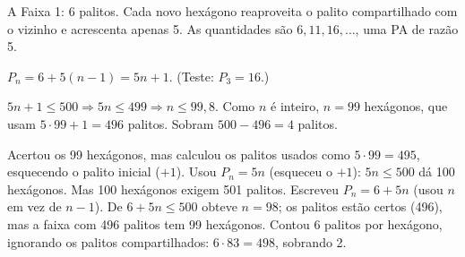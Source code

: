 \begin{resolucao}{A}
 Faixa 1: 6 palitos. Cada
novo hexágono reaproveita o palito compartilhado com o vizinho e acrescenta
apenas 5. As quantidades são $6, 11, 16, \dots$, uma PA de razão 5.

 $P_n = 6 + 5(n - 1) = 5n + 1$. (Teste: $P_3 = 16$.)

 $5n + 1 \le 500 \Rightarrow 5n \le 499
\Rightarrow n \le 99{,}8$. Como $n$ é inteiro, $n = 99$ hexágonos, que usam
$5 \cdot 99 + 1 = 496$ palitos. Sobram $500 - 496 = 4$ palitos.


\begin{distratores}
 Acertou os 99 hexágonos, mas calculou os palitos usados como
$5 \cdot 99 = 495$, esquecendo o palito inicial ($+1$).
 Usou $P_n = 5n$ (esqueceu o $+1$): $5n \le 500$ dá 100 hexágonos. Mas
100 hexágonos exigem 501 palitos.
 Escreveu $P_n = 6 + 5n$ (usou $n$ em vez de $n - 1$). De
$6 + 5n \le 500$ obteve $n = 98$; os palitos estão certos (496), mas a faixa
com 496 palitos tem 99 hexágonos.
 Contou 6 palitos por hexágono, ignorando os palitos compartilhados:
$6 \cdot 83 = 498$, sobrando 2.
\end{distratores}
\end{resolucao}

